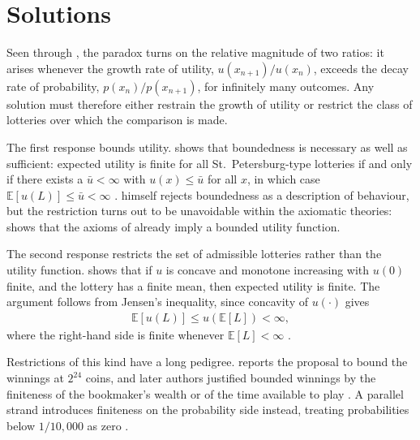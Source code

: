 \section{Solutions}

Seen through \citet{seidl2013meta}, the paradox turns on the relative magnitude of two ratios: it arises whenever the growth rate of utility, $u(x_{n+1})/u(x_n)$, exceeds the decay rate of probability, $p(x_n)/p(x_{n+1})$, for infinitely many outcomes.
Any solution must therefore either restrain the growth of utility or restrict the class of lotteries over which the comparison is made.

The first response bounds utility.
\citet{menger1934unbounded} shows that boundedness is necessary as well as sufficient: expected utility is finite for all St.\ Petersburg-type lotteries if and only if there exists a $\bar{u} < \infty$ with $u(x) \leq \bar{u}$ for all $x$, in which case $\mathbb{E}[u(L)] \leq \bar{u} < \infty$ \citep{seidl2013meta}.
\citet{menger1934unbounded} himself rejects boundedness as a description of behaviour, but the restriction turns out to be unavoidable within the axiomatic theories: \citet{fishburn1970utility} shows that the axioms of \citet{savage1954axiom} already imply a bounded utility function.

The second response restricts the set of admissible lotteries rather than the utility function. \citet{arrow1974unbounded} shows that if $u$ is concave and monotone increasing with $u(0)$ finite, and the lottery has a finite mean, then expected utility is finite.
The argument follows from Jensen's inequality, since concavity of $u(\cdot)$ gives
\begin{align*}
    \mathbb{E}[u(L)] \leq u\!\left(\mathbb{E}[L]\right) < \infty,
\end{align*}
where the right-hand side is finite whenever $\mathbb{E}[L] < \infty$ \citep{seidl2013meta}.

Restrictions of this kind have a long pedigree.
\citet{bernoulli1954exposition} reports the proposal to bound the winnings at $2^{24}$ coins, and later authors justified bounded winnings by the finiteness of the bookmaker's wealth or of the time available to play \citep{seidl2013meta}.
A parallel strand introduces finiteness on the probability side instead, treating probabilities below $1/10{,}000$ as zero \citep{seidl2013meta}.